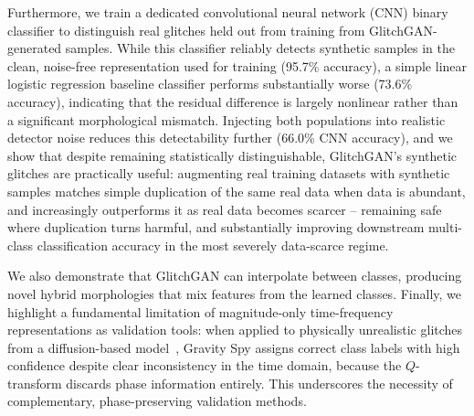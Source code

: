 \documentclass[reprint,nofootinbib,amsmath,amssymb,aps,floatfix]{revtex4-2}
\begin{document}
Furthermore, we train a dedicated convolutional neural network (CNN) binary classifier to distinguish real glitches held out from training from GlitchGAN-generated samples. While this classifier reliably detects synthetic samples in the clean, noise-free representation used for training (95.7\% accuracy), a simple linear logistic regression baseline classifier performs substantially worse (73.6\% accuracy), indicating that the residual difference is largely nonlinear rather than a significant morphological mismatch.
Injecting both populations into realistic detector noise reduces this detectability further (66.0\% CNN accuracy), and we show that despite remaining statistically distinguishable, GlitchGAN's synthetic glitches are practically useful: augmenting real training datasets with synthetic samples matches simple duplication of the same real data when data is abundant, and increasingly outperforms it as real data becomes scarcer -- remaining safe where duplication turns harmful, and substantially improving downstream multi-class classification accuracy in the most severely data-scarce regime.

We also demonstrate that GlitchGAN can interpolate between classes, producing novel hybrid morphologies that mix features from the learned classes.
Finally, we highlight a fundamental limitation of magnitude-only time-frequency representations as validation tools: when applied to physically unrealistic glitches from a diffusion-based model~\cite{diffusionOriginal}, Gravity Spy assigns correct class labels with high confidence despite clear inconsistency in the time domain, because the $Q$-transform discards phase information entirely.
This underscores the necessity of complementary, phase-preserving validation methods.

\end{document}
